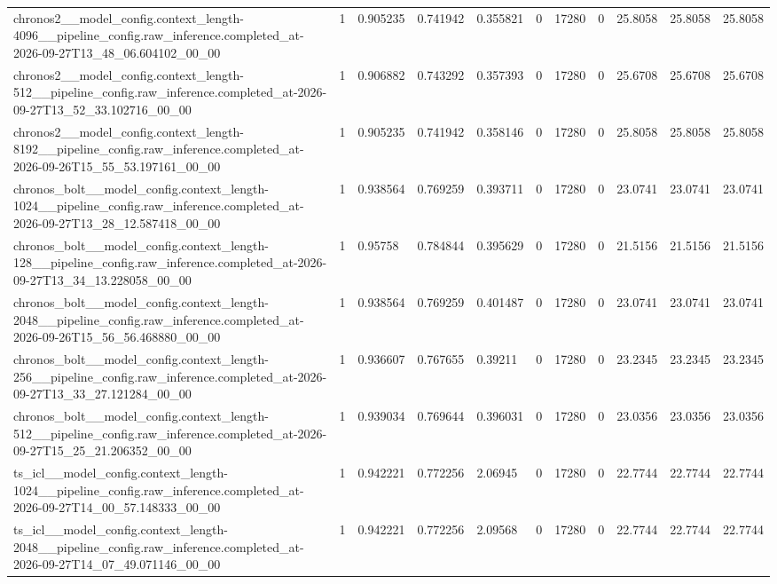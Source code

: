 \begin{tabular}{lllllllllll}
chronos2\_\_model\_config.context\_length-4096\_\_pipeline\_config.raw\_inference.completed\_at-2026-09-27T13\_48\_06.604102\_00\_00 & 1 & 0.905235 & 0.741942 & 0.355821 & 0 & 17280 & 0 & 25.8058 & 25.8058 & 25.8058 \\
chronos2\_\_model\_config.context\_length-512\_\_pipeline\_config.raw\_inference.completed\_at-2026-09-27T13\_52\_33.102716\_00\_00 & 1 & 0.906882 & 0.743292 & 0.357393 & 0 & 17280 & 0 & 25.6708 & 25.6708 & 25.6708 \\
chronos2\_\_model\_config.context\_length-8192\_\_pipeline\_config.raw\_inference.completed\_at-2026-09-26T15\_55\_53.197161\_00\_00 & 1 & 0.905235 & 0.741942 & 0.358146 & 0 & 17280 & 0 & 25.8058 & 25.8058 & 25.8058 \\
chronos\_bolt\_\_model\_config.context\_length-1024\_\_pipeline\_config.raw\_inference.completed\_at-2026-09-27T13\_28\_12.587418\_00\_00 & 1 & 0.938564 & 0.769259 & 0.393711 & 0 & 17280 & 0 & 23.0741 & 23.0741 & 23.0741 \\
chronos\_bolt\_\_model\_config.context\_length-128\_\_pipeline\_config.raw\_inference.completed\_at-2026-09-27T13\_34\_13.228058\_00\_00 & 1 & 0.95758 & 0.784844 & 0.395629 & 0 & 17280 & 0 & 21.5156 & 21.5156 & 21.5156 \\
chronos\_bolt\_\_model\_config.context\_length-2048\_\_pipeline\_config.raw\_inference.completed\_at-2026-09-26T15\_56\_56.468880\_00\_00 & 1 & 0.938564 & 0.769259 & 0.401487 & 0 & 17280 & 0 & 23.0741 & 23.0741 & 23.0741 \\
chronos\_bolt\_\_model\_config.context\_length-256\_\_pipeline\_config.raw\_inference.completed\_at-2026-09-27T13\_33\_27.121284\_00\_00 & 1 & 0.936607 & 0.767655 & 0.39211 & 0 & 17280 & 0 & 23.2345 & 23.2345 & 23.2345 \\
chronos\_bolt\_\_model\_config.context\_length-512\_\_pipeline\_config.raw\_inference.completed\_at-2026-09-27T15\_25\_21.206352\_00\_00 & 1 & 0.939034 & 0.769644 & 0.396031 & 0 & 17280 & 0 & 23.0356 & 23.0356 & 23.0356 \\
ts\_icl\_\_model\_config.context\_length-1024\_\_pipeline\_config.raw\_inference.completed\_at-2026-09-27T14\_00\_57.148333\_00\_00 & 1 & 0.942221 & 0.772256 & 2.06945 & 0 & 17280 & 0 & 22.7744 & 22.7744 & 22.7744 \\
ts\_icl\_\_model\_config.context\_length-2048\_\_pipeline\_config.raw\_inference.completed\_at-2026-09-27T14\_07\_49.071146\_00\_00 & 1 & 0.942221 & 0.772256 & 2.09568 & 0 & 17280 & 0 & 22.7744 & 22.7744 & 22.7744 \\

\end{tabular}

